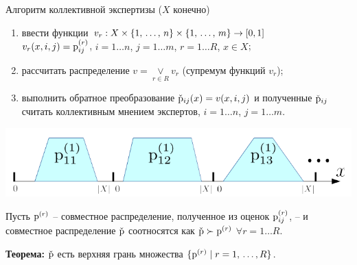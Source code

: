 \begin{frame}{Алгоритм коллективной экспертизы ($X$ конечно)}
 \begin{center}
      \vspace{-1ex}
	
	\vspace{-2mm}
	\begin{enumerate}
		\item ввести функции $v_r: X \times \{1,\, \ldots,\, n\} \times \{1,\, \ldots,\, m\} \rightarrow [0,1]$ 
		\\ $v_r(x, i, j) = {\mathrm{p}}_{ij}^{(r)}$, { \footnotesize $i = 1 \ldots n$, $j = 1 \ldots m$, $r = 1 \ldots R$, $x \in X$};
		\item рассчитать распределение $v = \underset{r \in R} \vee  v_r$ (супремум функций $v_r$); 
		\item выполнить обратное преобразование $\check{{\mathrm{p}}}_{ij}(x) = v(x, i,j)$ и полученные $\check{{\mathrm{p}}}_{ij}$  считать коллективным мнением экспертов, {\footnotesize $i = 1 \ldots n$, $j = 1 \ldots m$}.
	\end{enumerate}
	\vspace{-2mm}
	\includegraphics[width=0.85\linewidth]{./pic/glueon}
	\vspace{-1mm}
	 
	 Пусть ${\mathrm{p}}^{(r)}$ -- совместное распределение, полученное из оценок ${\mathrm{p}}_{ij}^{(r)}$, -- и совместное распределение $\check{{\mathrm{p}}}$ соотносятся как $\check{{\mathrm{p}}} \succ {\mathrm{p}}^{(r)}$  $\forall r = 1 \ldots R$. 
	 
	\textbf{Теорема:}  $\check{{\mathrm{p}}}$ есть верхняя грань множества $\{{\mathrm{p}}^{(r)} \mid r=1,\, \ldots, R\}$.
 \end{center}
\end{frame} %


